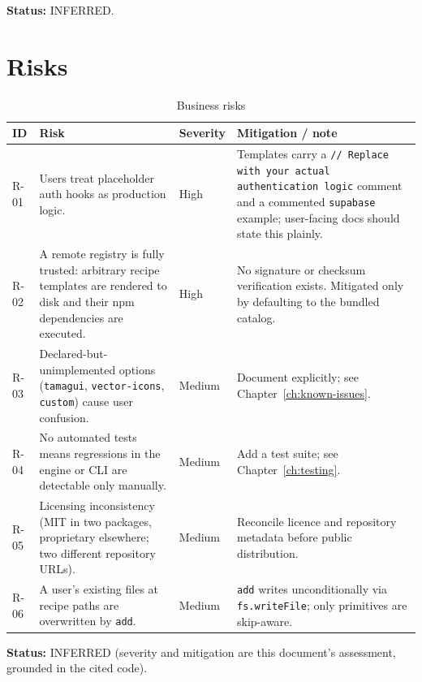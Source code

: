 \textbf{Status:} INFERRED.

\section{Risks}

\begin{longtable}{p{1.5cm}p{5.2cm}p{1.9cm}p{5.8cm}}
\caption{Business risks}\\
\toprule
\textbf{ID} & \textbf{Risk} & \textbf{Severity} & \textbf{Mitigation / note} \\
\midrule

R-01 & Users treat placeholder auth hooks as production logic. & High & Templates carry a \texttt{// Replace with your actual authentication logic} comment and a commented \texttt{supabase} example; user-facing docs should state this plainly. \\
R-02 & A remote registry is fully trusted: arbitrary recipe templates are rendered to disk and their npm dependencies are executed. & High & No signature or checksum verification exists. Mitigated only by defaulting to the bundled catalog. \\
R-03 & Declared-but-unimplemented options (\texttt{tamagui}, \texttt{vector-icons}, \texttt{custom}) cause user confusion. & Medium & Document explicitly; see Chapter~\ref{ch:known-issues}. \\
R-04 & No automated tests means regressions in the engine or CLI are detectable only manually. & Medium & Add a test suite; see Chapter~\ref{ch:testing}. \\
R-05 & Licensing inconsistency (MIT in two packages, proprietary elsewhere; two different repository URLs). & Medium & Reconcile licence and repository metadata before public distribution. \\
R-06 & A user's existing files at recipe paths are overwritten by \texttt{add}. & Medium & \texttt{add} writes unconditionally via \texttt{fs.writeFile}; only primitives are skip-aware. \\
\bottomrule
\end{longtable}

\textbf{Status:} INFERRED (severity and mitigation are this document's assessment,
grounded in the cited code).

